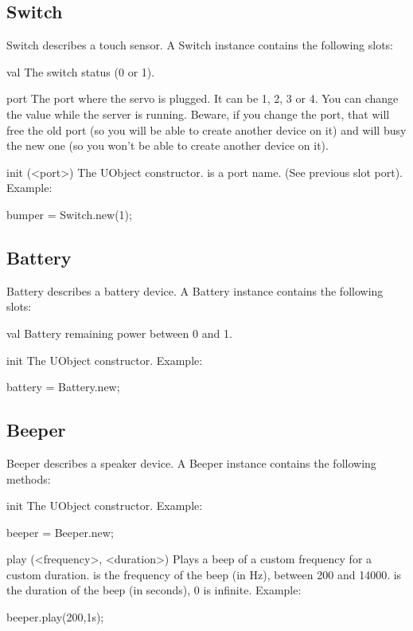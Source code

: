 \subsection{Switch}
Switch describes a touch sensor. A Switch instance contains the following
slots:

\begin{urbiscriptapi}
\item[val] The switch status (0 or 1).

\item[port] The port where the servo is plugged. It can be 1, 2, 3 or 4. You
  can change the value while the server is running. Beware, if you change
  the port, that will free the old port (so you will be able to create
  another device on it) and will busy the new one (so you won't be able to
  create another device on it).

\item[init](<port>) The UObject constructor.  is a port name. (See
  previous slot port). Example:
\begin{urbiunchecked}
bumper = Switch.new(1);
\end{urbiunchecked}

\end{urbiscriptapi}

\subsection{Battery}
Battery describes a battery device. A Battery instance contains the
following slots:
\begin{urbiscriptapi}
\item[val] Battery remaining power between 0 and 1.
\item[init] The UObject constructor. Example:
\begin{urbiunchecked}
battery = Battery.new;
\end{urbiunchecked}
\end{urbiscriptapi}

\subsection{Beeper}
Beeper describes a speaker device. A Beeper instance contains the following
methods:

\begin{urbiscriptapi}
\item[init] The UObject constructor.  Example:
\begin{urbiunchecked}
beeper = Beeper.new;
\end{urbiunchecked}
\item[play](<frequency>, <duration>) Plays a beep of a custom frequency for
  a custom duration.   is the frequency of the beep (in Hz),
  between 200 and 14000.   is the duration of the beep (in
  seconds), 0 is infinite.  Example:
\begin{urbiunchecked}
beeper.play(200,1s);
\end{urbiunchecked}
\end{urbiscriptapi}

